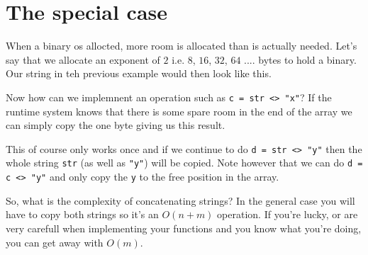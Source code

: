 \documentclass[a4paper,11pt]{article}
\begin{document}
\section*{The special case}

When a binary os allocted, more room is allocated than is actually
needed. Let's say that we allocate an exponent of $2$ i.e. $8$, $16$, $32$,
$64$ .... bytes to hold a binary. Our string in teh previous example
would then look like this.


Now how can we implemnent an operation such as {\tt c = str <> "x"}?
If the runtime system knows that there is some spare room in the end
of the array we can simply copy the one byte giving us this result.



This of course only works once and if we continue to do {\tt d = str
  <> "y"} then the whole string {\tt str} (as well as {\tt "y"}) will
be copied. Note however that we can do {\tt d = c <> "y"} and only
copy the {\tt y} to the free position in the array.

So, what is the complexity of concatenating strings? In the general
case you will have to copy both strings so it's an $O(n+m)$
operation. If you're lucky, or are very carefull when implementing
your functions and you know what you're doing, you can get away with
$O(m)$.
\end{document}
